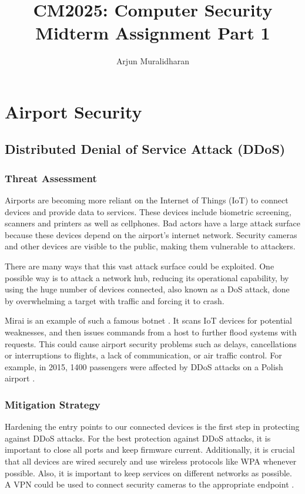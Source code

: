 \title{CM2025: Computer Security \\ Midterm Assignment Part 1}
\author{Arjun Muralidharan}



\section{Airport Security}

\subsection{Distributed Denial of Service Attack (DDoS)}
\subsubsection{Threat Assessment}
Airports are becoming more reliant on the Internet of Things (IoT) to connect devices and provide data to services. These devices include biometric screening, scanners and printers as well as cellphones. Bad actors have a large attack surface because these devices depend on the airport's internet network. Security cameras and other devices are visible to the public, making them vulnerable to attackers.

There are many ways that this vast attack surface could be exploited. One possible way is to attack a network hub, reducing its operational capability, by using the huge number of devices connected, also known as a DoS attack, done by overwhelming a target with traffic and forcing it to crash.

Mirai is an example of such a famous botnet \cite{jgamblin}. It scans IoT devices for potential weaknesses, and then issues commands from a host to further flood systems with requests. This could cause airport security problems such as delays, cancellations or interruptions to flights, a lack of communication, or air traffic control. For example, in 2015, 1400 passengers were affected by DDoS attacks on a Polish airport \cite{kharpal_2015}. 


\subsubsection{Mitigation Strategy}
Hardening the entry points to our connected devices is the first step in protecting against DDoS attacks. For the best protection against DDoS attacks, it is important to close all ports and keep firmware current. Additionally, it is crucial that all devices are wired securely and use wireless protocols like WPA whenever possible. Also, it is important to keep services on different networks as possible. A VPN could be used to connect security cameras to the appropriate endpoint \cite{lykou_anagnostopoulou_gritzalis_2018}. 

